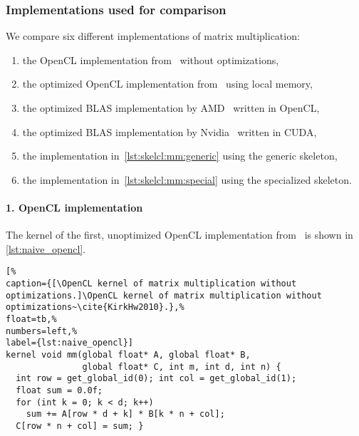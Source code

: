 \subsubsection*{Implementations used for comparison}
We compare six different implementations of matrix multiplication:
\begin{enumerate}
  \item the OpenCL implementation from~\cite{KirkHw2010} without optimizations,
  \item the optimized OpenCL implementation from~\cite{KirkHw2010} using \GPU local memory,
  \item the optimized BLAS implementation by AMD~\cite{APPML} written in OpenCL,
  \item the optimized BLAS implementation by Nvidia~\cite{cuBLAS} written in CUDA,
  \item the \SkelCL implementation in~\autoref{lst:skelcl:mm:generic} using the generic \allpairs skeleton,
  \item the \SkelCL implementation in~\autoref{lst:skelcl:mm:special} using the specialized \allpairs skeleton.
\end{enumerate}

\paragraph{1. OpenCL implementation}
The kernel of the first, unoptimized OpenCL implementation from~\cite{KirkHw2010} is shown in \autoref{lst:naive_opencl}.
\begin{lstlisting}[%                                                             
caption={[\OpenCL kernel of matrix multiplication without optimizations.]\OpenCL kernel of matrix multiplication without optimizations~\cite{KirkHw2010}.},%
float=tb,%
numbers=left,%
label={lst:naive_opencl}]
kernel void mm(global float* A, global float* B,
               global float* C, int m, int d, int n) {
  int row = get_global_id(0); int col = get_global_id(1);
  float sum = 0.0f;
  for (int k = 0; k < d; k++)
    sum += A[row * d + k] * B[k * n + col];
  C[row * n + col] = sum; }
\end{lstlisting}

\vspace{-.5em}
